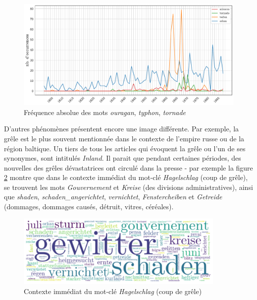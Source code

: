 \documentclass[a4paper,twoside,12pt]{article}
\begin{document}
\begin{figure}[h]
    \centering
    \includegraphics[width=\textwidth]{images/orkan_taifun_tornado.pdf}
    \caption{Fréquence absolue des mots \textit{ouragan}, \textit{typhon}, \textit{tornade}}
    \label{fig:orkan_taifun_tornado}
\end{figure}

D'autres phénomènes présentent encore une image différente. Par exemple, la grêle est le plus souvent mentionnée dans le contexte de l'empire russe ou de la région baltique. Un tiers de tous les articles qui évoquent la grêle ou l'un de ses synonymes, sont intitulés \textit{Inland}. Il parait que pendant certaines périodes, des nouvelles des grêles dévastatrices ont circulé dans la presse - par exemple la figure \ref{fig:hagelschlag} montre que dans le contexte immédiat du mot-clé \textit{Hagelschlag} (coup de grêle), se trouvent les mots \textit{Gouvernement} et \textit{Kreise} (des divisions administratives), ainsi que \textit{shaden}, \textit{schaden\_angerichtet}, \textit{vernichtet}, \textit{Fenstercheiben} et \textit{Getreide} (dommages, dommages causés, détruit, vitres, céréales). \label{about:hagel}

\begin{figure}[h]
    \centering
    \includegraphics[width=0.9\textwidth]{images/wordcloud_hagelschlag.pdf}
    \caption{Contexte immédiat du mot-clé \textit{Hagelschlag} (coup de grêle)}
    \label{fig:hagelschlag}
\end{figure}
\end{document}
